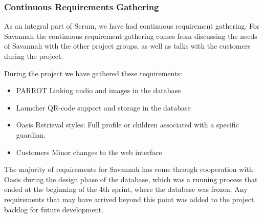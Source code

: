 \begin{comment} 
These requirements are set by our customers, however, since this system is dealing with potentially sensitive personal data, it is 
also a requirement that before it can be deployed in a real world situation, that all communication are done via a secure connection.
\end{comment}%

\subsubsection*{Continuous Requirements Gathering}
As an integral part of Scrum, we have had continuous requirement gathering.
For Savannah the continuous requirement gathering comes from discussing the needs of Savannah with the other project groups, as well as talks with the customers
during the project.

During the project we have gathered these requirements:
\begin{itemize}
 \item PARROT
  \subitem Linking audio and images in the database
 \item Launcher
  \subitem QR-code support and storage in the database
 \item Oasis
  \subitem Retrieval styles: Full profile or children associated with a specific guardian.
 \item Customers
  \subitem Minor changes to the web interface
\end{itemize}

The majority of requirements for Savannah has come through cooperation with Oasis during the design phase of the database, which was a running process that ended
at the beginning of the 4th sprint, where the database was frozen. Any requirements that may have arrived beyond this point was added to the project backlog for future development.